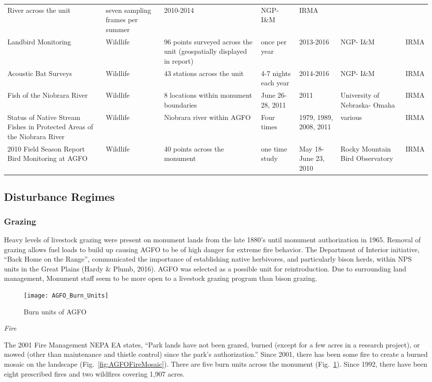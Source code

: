\begin{longtable}[l]{@{}p{5cm}p{2cm}p{3cm}p{4cm}p{3cm}p{4cm}p{3cm}@{}}
River across the unit & seven sampling frames per summer & 2010-2014 &
NGP- I\&M & IRMA\tabularnewline
Landbird Monitoring & Wildlife & 96 points surveyed across the unit
(geospatially displayed in report) & once per year & 2013-2016 & NGP-
I\&M & IRMA\tabularnewline
Acoustic Bat Surveys & Wildlife & 43 stations across the unit & 4-7
nights each year & 2014-2016 & NGP- I\&M & IRMA\tabularnewline
Fish of the Niobrara River & Wildlife & 8 locations within monument
boundaries & June 26-28, 2011 & 2011 & University of Nebraska- Omaha &
IRMA\tabularnewline
Status of Native Stream Fishes in Protected Areas of the Niobrara River
& Wildlife & Niobrara river within AGFO & Four times & 1979, 1989, 2008,
2011 & various & IRMA\tabularnewline
2010 Field Season Report Bird Monitoring at AGFO & Wildlife & 40 points
across the monument & one time study & May 18- June 23, 2010 & Rocky
Mountain Bird Observatory & IRMA\tabularnewline
\bottomrule
\end{longtable}
\clearpage
\normalsetting
\pagestyle{fancy} 

\subsection{Disturbance Regimes }

\subsubsection{Grazing }

Heavy levels of livestock grazing were present on monument lands from the late 1880's until monument authorization in 1965. 
Removal of grazing allows fuel loads to build up causing AGFO to be of high danger for extreme fire behavior. 
The Department of Interior initiative, ``Back Home on the Range'', communicated the importance of establishing native herbivores, and particularly bison herds, within NPS units in the Great Plains (Hardy \& Plumb, 2016). 
AGFO was selected as a possible unit for reintroduction. 
Due to surrounding land management, Monument staff seem to be more open to a livestock grazing program than bison grazing.

\begin{figure}
	\centering
	\texttt{[image: AGFO\_Burn\_Units]}
	\caption{Burn units of AGFO}\label{fig:AGFOBurnUnits}
\end{figure}

\emph{Fire }

The 2001 Fire Management NEPA EA states, ``Park lands have not been grazed, burned (except for a few acres in a research project), or mowed (other than maintenance and thistle control) since the park's authorization.'' 
Since 2001, there has been some fire to create a burned
mosaic on the landscape (Fig.~\ref{fig:AGFOFireMosaic}). 
There are five burn units across the monument (Fig.~\ref{fig:AGFOBurnUnits}). 
Since 1992, there have been eight prescribed fires and two wildfires covering 1,907 acres.

